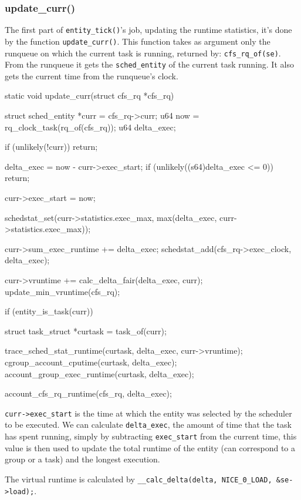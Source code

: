 \subsubsection{update\_curr()}

The first part of \verb|entity_tick()|'s job, updating the runtime statistics, it's done by the function \verb|update_curr()|. This function takes as argument only the runqueue on which the current task is running, returned by: \verb|cfs_rq_of(se)|. From the runqueue it gets the \verb|sched_entity| of the current task running. It also gets the current time from the runqueue's clock.

\begin{code}
static void update_curr(struct cfs_rq *cfs_rq)
{
	struct sched_entity *curr = cfs_rq->curr;
	u64 now = rq_clock_task(rq_of(cfs_rq));
	u64 delta_exec;

	if (unlikely(!curr))
		return;

	delta_exec = now - curr->exec_start;
	if (unlikely((s64)delta_exec <= 0))
		return;

	curr->exec_start = now;

	schedstat_set(curr->statistics.exec_max,
		      max(delta_exec, curr->statistics.exec_max));

	curr->sum_exec_runtime += delta_exec;
	schedstat_add(cfs_rq->exec_clock, delta_exec);

	curr->vruntime += calc_delta_fair(delta_exec, curr);
	update_min_vruntime(cfs_rq);

	if (entity_is_task(curr)) {
		struct task_struct *curtask = task_of(curr);

		trace_sched_stat_runtime(curtask, delta_exec, curr->vruntime);
		cgroup_account_cputime(curtask, delta_exec);
		account_group_exec_runtime(curtask, delta_exec);
	}

	account_cfs_rq_runtime(cfs_rq, delta_exec);
}
\end{code}

\verb|curr->exec_start| is the time at which the entity was selected by the scheduler to be executed. %
We can calculate \verb|delta_exec|, the amount of time that the task has spent running, simply by subtracting \verb|exec_start| from the current time, this value is then used to update the total runtime of the entity (can correspond to a group or a task) and the longest execution.

The virtual runtime is calculated by \newline \verb|__calc_delta(delta, NICE_0_LOAD, &se->load);|. %

